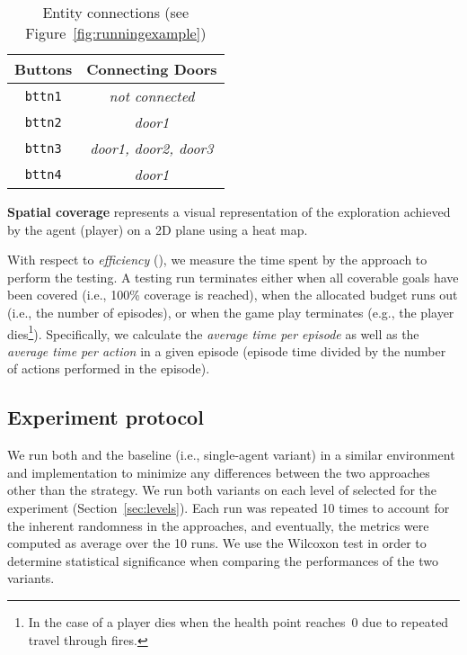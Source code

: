  \begin{table}[!h]
     \centering
     \begin{tabular}{c|c}
         \textbf{Buttons} & \textbf{Connecting Doors}  \\ \hline
         \texttt{bttn1} & \it{not connected}\\
         \texttt{bttn2} & \it{door1}\\
         \texttt{bttn3} & \it{door1}, \it{door2}, \it{door3}\\
         \texttt{bttn4} & \it{door1}\\
         \hline
         \end{tabular}
     \caption{Entity connections (see Figure~\ref{fig:runningexample})}
     \label{tab:connectioncoverage}
 \end{table}

\textbf{Spatial coverage} represents a visual representation of the exploration achieved by the agent (player) on a 2D plane using a heat map. 

With respect to \emph{efficiency} (\rqb), we measure the time spent by the approach to perform the testing. A testing run terminates either when all coverable goals have been covered (i.e., 100\% coverage is reached), when the allocated budget runs out (i.e., the number of episodes), or when the game play terminates (e.g., the player dies\footnote{In the case of \sut a player dies when the health point reaches~0 due to repeated travel through fires.}). Specifically, we calculate the \emph{average time per episode} as well as the \emph{average time per action} in a given episode (episode time divided by the number of actions performed in the episode).

\subsection{Experiment protocol} \label{sec:experimentexecution}
We run both \approach and the baseline (i.e., single-agent variant) in a similar environment and implementation to minimize any differences between the two approaches other than the \rl strategy. We run both variants on each level of \lr selected for the experiment (Section~\ref{sec:levels}). Each run was repeated 10 times to account for the inherent randomness in the approaches, and eventually, the metrics were computed as average over the 10 runs. We use the Wilcoxon test in order to determine statistical significance when comparing the performances of the two variants. 

